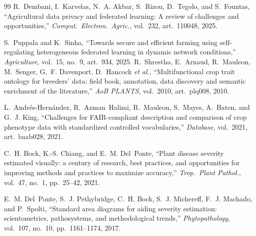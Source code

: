 \documentclass[conference]{IEEEtran}
\begin{document}
\begin{thebibliography}{99}
R.~Dembani, I.~Karvelas, N.~A. Akbar, S.~Rizou, D.~Tegolo, and S.~Fountas,
``Agricultural data privacy and federated learning: A review of challenges
and opportunities,'' \emph{Comput.~Electron.~Agric.}, vol.~232,
art.~110048, 2025.

S.~Puppala and K.~Sinha, ``Towards secure and efficient farming using
self-regulating heterogeneous federated learning in dynamic network
conditions,'' \emph{Agriculture}, vol.~15, no.~9, art.~934, 2025.
R.~Shrestha, E.~Arnaud, R.~Mauleon, M.~Senger, G.~F. Davenport, D.~Hancock
\emph{et al.}, ``Multifunctional crop trait ontology for breeders' data: field
book, annotation, data discovery and semantic enrichment of the literature,''
\emph{AoB PLANTS}, vol.~2010, art.~plq008, 2010.

L.~Andr\'es-Hern\'andez, R.~Azman~Halimi, R.~Mauleon, S.~Mayes, A.~Baten, and
G.~J. King, ``Challenges for {FAIR}-compliant description and comparison of crop
phenotype data with standardized controlled vocabularies,'' \emph{Database},
vol.~2021, art.~baab028, 2021.

C.~H. Bock, K.-S. Chiang, and E.~M. Del~Ponte, ``Plant disease severity estimated
visually: a century of research, best practices, and opportunities for improving
methods and practices to maximize accuracy,'' \emph{Trop.\ Plant Pathol.},
vol.~47, no.~1, pp.~25--42, 2021.

E.~M. Del~Ponte, S.~J. Pethybridge, C.~H. Bock, S.~J. Michereff, F.~J. Machado,
and P.~Spolti, ``Standard area diagrams for aiding severity estimation:
scientometrics, pathosystems, and methodological trends,''
\emph{Phytopathology}, vol.~107, no.~10, pp.~1161--1174, 2017.
\end{thebibliography}
\end{document}
